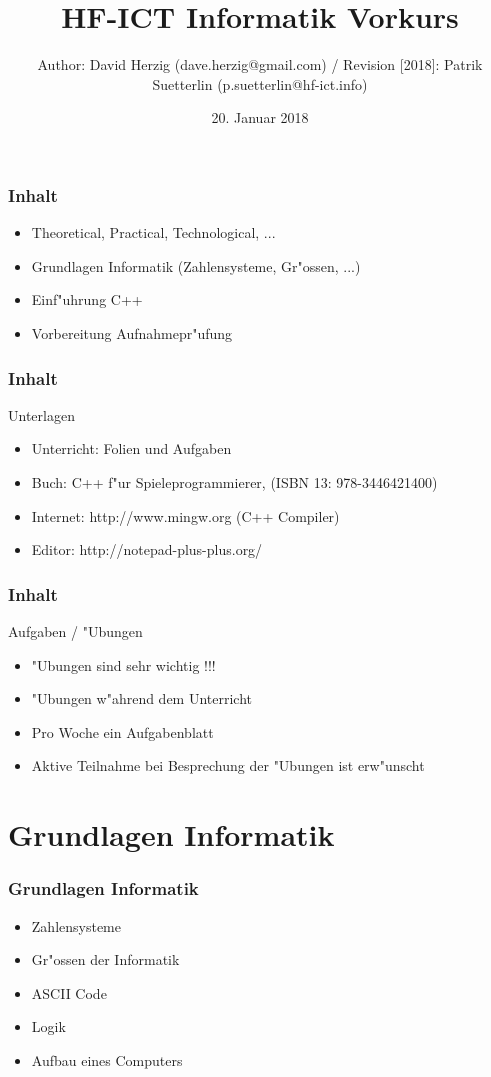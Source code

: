 \documentclass{beamer}
\title{HF-ICT Informatik Vorkurs}
\author{Author: David Herzig (dave.herzig@gmail.com) / Revision [2018]: Patrik Suetterlin (p.suetterlin@hf-ict.info)}
\date{20. Januar 2018}
\begin{document}
\frame{\titlepage}

\setcounter{tocdepth}{1}

\frame
{
	\frametitle{Inhalt}
	\begin{itemize}
	\item Theoretical, Practical, Technological, ...
	\item Grundlagen Informatik (Zahlensysteme, Gr"ossen, ...)
	\item Einf"uhrung C++
	\item Vorbereitung Aufnahmepr"ufung
	\end{itemize}
}

\frame
{
	\frametitle{Inhalt}
	Unterlagen
	\begin{itemize}
	\item Unterricht: Folien und Aufgaben
	\item Buch: C++ f"ur Spieleprogrammierer, (ISBN 13: 978-3446421400)
	\item Internet: http://www.mingw.org (C++ Compiler)
	\item Editor: http://notepad-plus-plus.org/
	\end{itemize}
}

\frame
{
	\frametitle{Inhalt}
	Aufgaben / "Ubungen
	\begin{itemize}
	\item "Ubungen sind sehr wichtig !!!
	\item "Ubungen w"ahrend dem Unterricht
	\item Pro Woche ein Aufgabenblatt
	\item Aktive Teilnahme bei Besprechung der "Ubungen ist erw"unscht
	\end{itemize}
}

\section{Grundlagen Informatik}
\frame
{
	\frametitle{Grundlagen Informatik}
	\begin{itemize}
	\item Zahlensysteme
	\item Gr"ossen der Informatik
	\item ASCII Code
	\item Logik
	\item Aufbau eines Computers
	\end{itemize}
}
\end{document}
